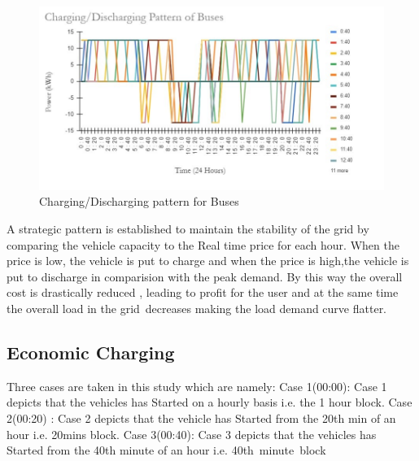 	\begin{figure}[!h]
		\centering
		\includegraphics[width=0.7\linewidth]{Figures/cp_case3}
		\caption{Charging/Discharging pattern for Buses}
		\label{fig:cpcase3}
	\end{figure}
	
	\noindent A strategic pattern is established to maintain the stability of the grid by comparing the vehicle capacity to the Real time price for each hour. When the price is low, the vehicle is put to charge and when the price is high,the vehicle is put to discharge in comparision with the peak demand. By this way the overall cost is drastically reduced , leading to profit for the user and at the same time the overall load in the grid decreases making the load demand curve flatter.
	
	
		\subsection{Economic Charging}
		
			Three cases are taken in this study which are namely:
				\newline Case 1(00:00): Case 1 depicts that the vehicles has Started on a hourly basis i.e. the 1 hour block.
				\newline Case 2(00:20) : Case 2 depicts that the vehicle has Started from the 20th min of an hour i.e. 20mins block.
				\newline Case 3(00:40): Case 3 depicts that the vehicles has Started from the 40th minute of an hour i.e. 40th minute block
			
